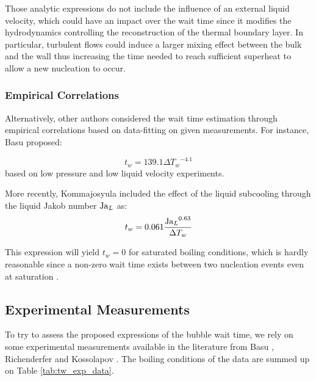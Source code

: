 \begin{remark*}{}
Those analytic expressions do not include the influence of an external liquid velocity, which could have an impact over the wait time since it modifies the hydrodynamics controlling the reconstruction of the thermal boundary layer. In particular, turbulent flows could induce a larger mixing effect between the bulk and the wall thus increasing the time needed to reach sufficient superheat to allow a new nucleation to occur.
\end{remark*}



\subsubsection{Empirical Correlations}

Alternatively, other authors considered the wait time estimation through empirical correlations based on data-fitting on given measurements. For instance, Basu \etal \cite{basu_wall_2005} proposed:

\begin{equation}
t_{w} = 139.1\Delta {T_{w}}^{-4.1}
\end{equation}
based on low pressure and low liquid velocity experiments.


\npar

More recently, Kommajosyula \cite{kommajosyula_development_2020} included the effect of the liquid subcooling through the liquid Jakob number $\mathrm{Ja}_{L}$ as:
\begin{equation}
t_{w} = 0.061\frac{{\mathrm{Ja}_{L}}^{0.63}}{\Delta T_{w}}
\end{equation}

\begin{remark*}
This expression will yield $t_{w}=0$ for saturated boiling conditions, which is hardly reasonable since a non-zero wait time exists between two nucleation events even at saturation \cite{gerardi_ijhmt_2010}.
\end{remark*}



\subsection{Experimental Measurements}

To try to assess the proposed expressions of the bubble wait time, we rely on some experimental measurements available in the literature from Basu \etal \cite{basu_wall_2005}, Richenderfer \cite{richenderfer_experimental_2018} and Kossolapov \cite{kossolapov_experimental_2021}. The boiling conditions of the data are summed up on Table \ref{tab:tw_exp_data}.

